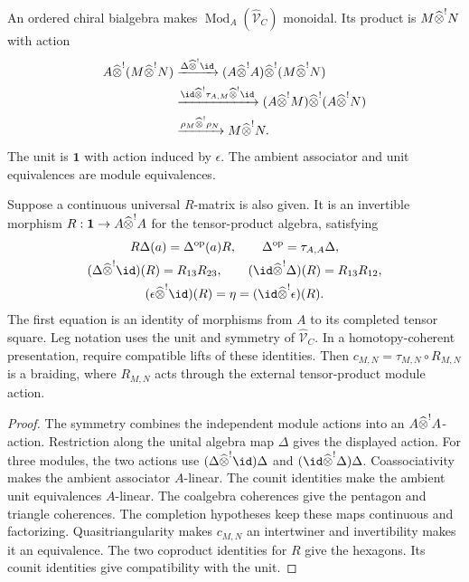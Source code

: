 \begin{theorem}\label{thm:vol4-representation-fusion}
An ordered chiral bialgebra makes
$\operatorname{Mod}_A(\widehat{\mathcal V}_C)$ monoidal.
Its product is $M\widehat{\mathbin{\otimes}}^{!}N$ with action
\[
\begin{aligned}
 A\widehat{\tensor}^{!}(M\widehat{\tensor}^{!}N)
 &\xrightarrow{\Delta\widehat{\tensor}^{!}\id}
 (A\widehat{\tensor}^{!}A)\widehat{\tensor}^{!}
 (M\widehat{\tensor}^{!}N)\\
 &\xrightarrow{\id\widehat{\tensor}^{!}\tau_{A,M}
                       \widehat{\tensor}^{!}\id}
 (A\widehat{\tensor}^{!}M)\widehat{\tensor}^{!}
 (A\widehat{\tensor}^{!}N)\\
 &\xrightarrow{\rho_M\widehat{\tensor}^{!}\rho_N}
 M\widehat{\tensor}^{!}N.
\end{aligned}
\]
The unit is $\mathbf1$ with action induced by $\epsilon$.
The ambient associator and unit equivalences are module equivalences.

Suppose a continuous universal $R$-matrix is also given.
It is an invertible morphism
$R:\mathbf1\to A\widehat{\mathbin{\otimes}}^{!}A$ for the tensor-product algebra,
satisfying
\[
\begin{gathered}
 R\Delta(a)=\Delta^{\op}(a)R,\qquad
 \Delta^{\op}=\tau_{A,A}\Delta,\\
 (\Delta\widehat{\tensor}^{!}\id)(R)=R_{13}R_{23},
 \qquad
 (\id\widehat{\tensor}^{!}\Delta)(R)=R_{13}R_{12},\\
 (\epsilon\widehat{\tensor}^{!}\id)(R)=\eta
 =(\id\widehat{\tensor}^{!}\epsilon)(R).
\end{gathered}
\]
The first equation is an identity of morphisms from $A$ to its completed tensor square.
Leg notation uses the unit and symmetry of $\widehat{\mathcal V}_C$.
In a homotopy-coherent presentation, require compatible lifts of these identities.
Then $c_{M,N}=\tau_{M,N}\circ R_{M,N}$ is a braiding,
where $R_{M,N}$ acts through the external tensor-product module action.
\end{theorem}
\begin{proof}
The symmetry combines the independent module actions into an
$A\widehat{\mathbin{\otimes}}^{!}A$-action.
Restriction along the unital algebra map $\Delta$ gives the displayed action.
For three modules, the two actions use
$(\Delta\widehat{\tensor}^{!}\id)\Delta$ and
$(\id\widehat{\tensor}^{!}\Delta)\Delta$.
Coassociativity makes the ambient associator $A$-linear.
The counit identities make the ambient unit equivalences $A$-linear.
The coalgebra coherences give the pentagon and triangle coherences.
The completion hypotheses keep these maps continuous and factorizing.
Quasitriangularity makes $c_{M,N}$ an intertwiner and invertibility makes it an equivalence.
The two coproduct identities for $R$ give the hexagons.
Its counit identities give compatibility with the unit.
\end{proof}


